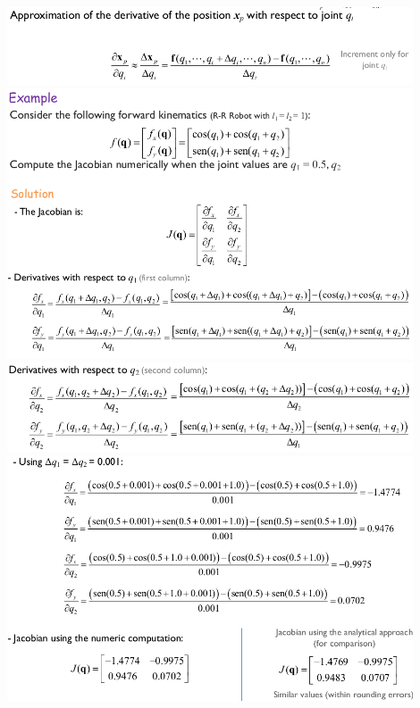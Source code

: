 \begin{center}
	\includegraphics[width=12cm]{sections/imgs/24.png}\\
	\includegraphics[width=12cm]{sections/imgs/25.png}\\
	\includegraphics[width=12cm]{sections/imgs/26.png}\\
	\includegraphics[width=12cm]{sections/imgs/28.png}	
\end{center}

